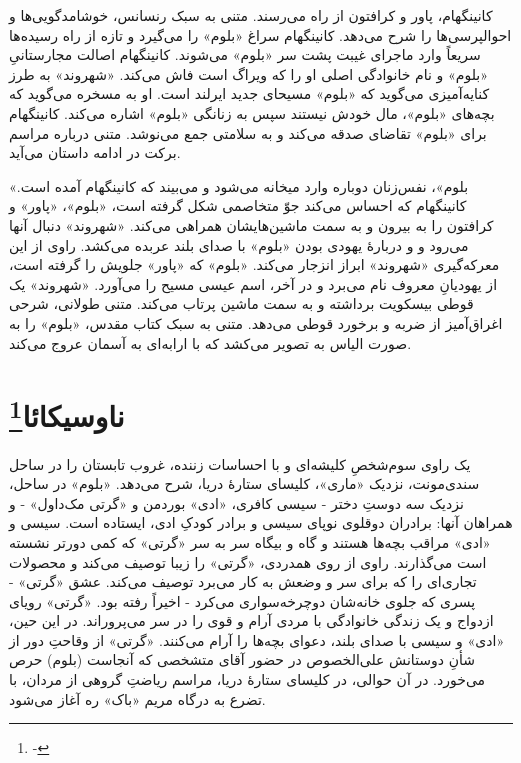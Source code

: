 \documentclass[12pt]{book}
\newcommand{\noun}[1]{«{#1}»}
\begin{document}
    کانینگهام، پاور و کرافتون از راه می‌رسند. متنی به سبک رنسانس، خوشامدگویی‌ها و احوالپرسی‌ها را شرح می‌دهد. کانینگهام سراغ \noun{بلوم} را می‌گیرد و تازه از راه رسیده‌ها سریعاً وارد ماجرای غیبت پشت سر \noun{بلوم} می‌شوند. کانینگهام اصالت مجارستانیِ \noun{بلوم} و نام خانوادگی اصلی او را که ویراگ است فاش می‌کند. \noun{شهروند‬} به طرز کنایه‌آمیزی می‌گوید که \noun{بلوم} مسیحای جدید ایرلند است. او به مسخره می‌گوید که بچه‌های \noun{بلوم}، مال خودش نیستند سپس به زنانگی \noun{بلوم} اشاره می‌کند. کانینگهام برای \noun{بلوم} تقاضای صدقه می‌کند و به سلامتی جمع می‌نوشد. متنی درباره مراسم برکت در ادامه داستان می‌آید.

    \noun{بلوم}، نفس‌زنان دوباره وارد میخانه می‌شود و می‌بیند که کانینگهام آمده است. کانینگهام که احساس می‌کند جوّ متخاصمی شکل گرفته است، \noun{بلوم}، \noun{پاور} و کرافتون را به بیرون و به سمت ماشین‌هایشان همراهی می‌کند. \noun{شهروند‬} دنبال آنها می‌رود و و دربارۀ یهودی بودن \noun{بلوم} با صدای بلند عربده می‌کشد. راوی از این معرکه‌گیری \noun{شهروند‬} ابراز انزجار می‌کند. \noun{بلوم} که \noun{پاور} جلویش را گرفته است، از یهودیانِ معروف نام می‌برد و در آخر، اسم عیسی مسیح را می‌آورد. \noun{شهروند‬} یک قوطی بیسکویت برداشته و به سمت ماشین پرتاب می‌کند. متنی طولانی، شرحی اغراق‌آمیز از ضربه و برخورد قوطی می‌دهد. متنی به سبک کتاب مقدس، \noun{بلوم} را به صورت الیاس به تصویر می‌کشد که با ارابه‌ای به آسمان عروج می‌کند.

    \chapter[ناوسیکائا]{ناوسیکائا\protect\footnote{-}}\label{ep:13}
    یک راوی سوم‌شخصِ کلیشه‌ای و با احساسات زننده، غروب تابستان را در ساحل سندی‌مونت، نزدیک \noun{ماری}، کلیسای ستارۀ دریا، شرح می‌دهد. \noun{بلوم} در ساحل، نزدیک سه دوستِ دختر - سیسی کافری، \noun{ادی} بوردمن و \noun{گرتی مک‌داول‬} - و همراهان آنها: برادران دوقلوی نوپای سیسی و برادر کودکِ ادی، ایستاده است. سیسی و \noun{ادی} مراقب بچه‌ها هستند و گاه و بیگاه سر به سر \noun{گرتی} که کمی دورتر نشسته است می‌گذارند. راوی از روی همدردی، \noun{گرتی} را زیبا توصیف می‌کند و محصولات تجاری‌ای را که برای سر و وضعش به کار می‌برد توصیف می‌کند. عشق \noun{گرتی} - پسری که جلوی خانه‌شان دوچرخه‌سواری می‌کرد - اخیراً رفته بود. \noun{گرتی} رویای ازدواج و یک زندگی خانوادگی با مردی آرام و قوی را در سر می‌پروراند. در این حین، \noun{ادی} و سیسی با صدای بلند، دعوای بچه‌ها را آرام می‌کنند. \noun{گرتی} از وقاحتِ دور از شأنِ دوستانش علی‌الخصوص در حضور آقای متشخصی که آنجاست (بلوم) حرص می‌خورد. در آن حوالی، در کلیسای ستارۀ دریا، مراسم ریاضتِ گروهی از مردان، با تضرع به درگاه مریم \noun{باک} ره آغاز می‌شود.
\end{document}
